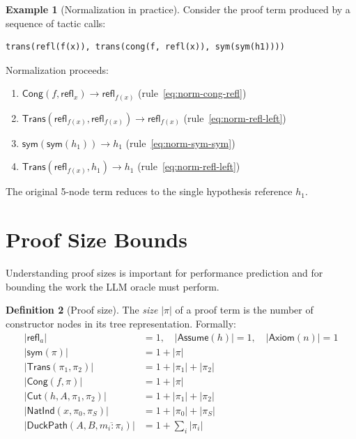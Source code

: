 \documentclass[11pt,a4paper]{report}
\theoremstyle{definition}
\newtheorem{definition}{Definition}[chapter]
\newtheorem{example}[definition]{Example}
\theoremstyle{plain}
\newcommand{\Refl}{\mathsf{refl}}
\newcommand{\sym}{\mathsf{sym}}
\newcommand{\Cut}{\mathsf{Cut}}
\newcommand{\Assume}{\mathsf{Assume}}
\newcommand{\Trans}{\mathsf{Trans}}
\newcommand{\Cong}{\mathsf{Cong}}
\begin{document}
\begin{example}[Normalization in practice]
Consider the proof term produced by a sequence of tactic calls:
\begin{lstlisting}[style=proof]
trans(refl(f(x)), trans(cong(f, refl(x)), sym(sym(h1))))
\end{lstlisting}
Normalization proceeds:
\begin{enumerate}
  \item $\Cong(f, \Refl_x) \longrightarrow \Refl_{f(x)}$ \hfill (rule~\eqref{eq:norm-cong-refl})
  \item $\Trans(\Refl_{f(x)}, \Refl_{f(x)}) \longrightarrow \Refl_{f(x)}$
        \hfill (rule~\eqref{eq:norm-refl-left})
  \item $\sym(\sym(h_1)) \longrightarrow h_1$
        \hfill (rule~\eqref{eq:norm-sym-sym})
  \item $\Trans(\Refl_{f(x)}, h_1) \longrightarrow h_1$
        \hfill (rule~\eqref{eq:norm-refl-left})
\end{enumerate}
The original 5-node term reduces to the single hypothesis reference $h_1$.
\end{example}


\section{Proof Size Bounds}
\label{sec:proof-size}

Understanding proof sizes is important for performance prediction and
for bounding the work the LLM oracle must perform.

\begin{definition}[Proof size]
The \emph{size} $|\pi|$ of a proof term is the number of constructor nodes
in its tree representation. Formally:
\begin{align}
  |\Refl_a| &= 1, \quad |\Assume(h)| = 1, \quad |\mathsf{Axiom}(n)| = 1 \\
  |\sym(\pi)| &= 1 + |\pi| \\
  |\Trans(\pi_1, \pi_2)| &= 1 + |\pi_1| + |\pi_2| \\
  |\Cong(f, \pi)| &= 1 + |\pi| \\
  |\Cut(h, A, \pi_1, \pi_2)| &= 1 + |\pi_1| + |\pi_2| \\
  |\mathsf{NatInd}(x, \pi_0, \pi_S)| &= 1 + |\pi_0| + |\pi_S| \\
  |\mathsf{DuckPath}(A, B, \overline{m_i : \pi_i})| &= 1 + \sum_i |\pi_i|
\end{align}
\end{definition}
\end{document}
